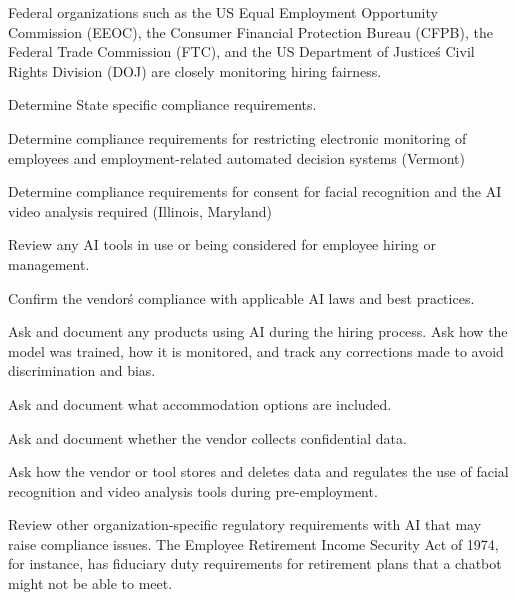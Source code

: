 Federal organizations such as the US Equal Employment Opportunity Commission
(EEOC), the Consumer Financial Protection Bureau (CFPB), the Federal Trade
Commission (FTC), and the US Department of Justice\'s Civil Rights Division
(DOJ) are closely monitoring hiring fairness.
\begin{minipage}{\linewidth}
\begin{checklist}
  \item Determine State specific compliance requirements.
  \item Determine compliance requirements for restricting electronic monitoring of employees and employment-related automated decision systems (Vermont)
  \item Determine compliance requirements for consent for facial recognition and the AI video analysis required (Illinois, Maryland)
  \item Review any AI tools in use or being considered for employee hiring or management.
  \item Confirm the vendor\'s compliance with applicable AI laws and best practices.
  \item Ask and document any products using AI during the hiring process. Ask how the model was trained, how it is monitored, and track any corrections made to avoid discrimination and bias.
  \item Ask and document what accommodation options are included.
  \item Ask and document whether the vendor collects confidential data.
  \item Ask how the vendor or tool stores and deletes data and regulates the use of facial recognition and video analysis tools during pre-employment.
  \item Review other organization-specific regulatory requirements with AI that may raise compliance issues. The Employee Retirement Income Security Act of 1974, for instance, has fiduciary duty requirements for retirement plans that a chatbot might not be able to meet.
\end{checklist}
\end{minipage}

